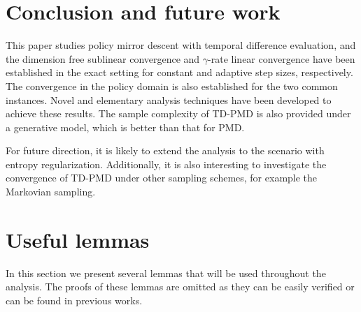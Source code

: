 \documentclass[10pt]{article}
\theoremstyle{plain}
\theoremstyle{definition}
\begin{document}
\section{Conclusion and future work}\label{sec:conclusion}
This paper studies policy mirror descent with temporal difference evaluation, and the dimension free sublinear convergence and $\gamma$-rate linear convergence have been established in the exact setting for constant and adaptive step sizes, respectively. {The convergence in the policy domain is also established for the two common instances}. Novel and elementary analysis techniques have been developed to achieve these results. The sample complexity of TD-PMD is also provided under a generative model, which is better than that for PMD. 

For future direction, {it is likely to extend the analysis to the scenario with entropy regularization}. Additionally, it is also interesting to investigate the convergence of TD-PMD under other sampling schemes, for example the Markovian sampling.






\appendix










\section{Useful lemmas}
In this section we present several  lemmas that will be used throughout the analysis. The proofs of these lemmas are omitted as they can be easily verified or can be found in previous works.
\end{document}
